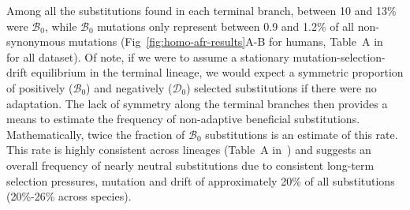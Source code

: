 \documentclass[10pt,letterpaper]{article}
\newcommand{\SphyDel}{\mathcal{D}_0}
\newcommand{\SphyBen}{\mathcal{B}_0}
\begin{document}
Among all the substitutions found in each terminal branch, between 10 and 13\% were $\SphyBen$, while $\SphyBen$ mutations only represent between 0.9 and 1.2\% of all non-synonymous mutations (Fig~\ref{fig:homo-afr-results}A-B for humans, Table~A in~ for all dataset).
Of note, if we were to assume a stationary mutation-selection-drift equilibrium in the terminal lineage, we would expect a symmetric proportion of positively ($\SphyBen$) and negatively ($\SphyDel$) selected substitutions if there were no adaptation.
The lack of symmetry along the terminal branches then provides a means to estimate the frequency of non-adaptive beneficial substitutions.
Mathematically, twice the fraction of $\SphyBen$ substitutions is an estimate of this rate.
This rate is highly consistent across lineages (Table~A in~) and suggests an overall frequency of nearly neutral substitutions due to consistent long-term selection pressures, mutation and drift of approximately 20\% of all substitutions (20\%-26\% across species).
\end{document}
